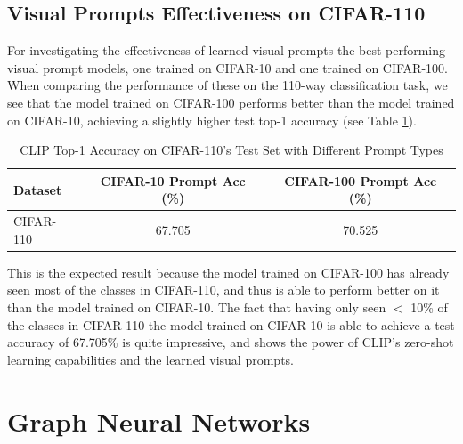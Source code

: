 \documentclass[a4paper]{article}
\begin{document}
\subsection{Visual Prompts Effectiveness on CIFAR-110}
For investigating the effectiveness of learned visual prompts the best performing visual prompt models, one trained
on CIFAR-10 and one trained on CIFAR-100. When comparing the performance of these on the 110-way classification
task, we see that the model trained on CIFAR-100 performs better than the model trained on CIFAR-10, achieving a
slightly higher test top-1 accuracy (see Table \ref{tab:cifar110}).

\begin{table}[h]
    \centering
    \begin{tabular}{|l|c|c|}
    \hline
    \rowcolor{Gray}
    \textbf{Dataset} & \textbf{CIFAR-10 Prompt Acc (\%)} & \textbf{CIFAR-100 Prompt Acc (\%)} \\ \hline
    CIFAR-110 & 67.705 & 70.525 \\ \hline
    \end{tabular}
    \caption{CLIP Top-1 Accuracy on CIFAR-110's Test Set with Different Prompt Types}
    \label{tab:cifar110}
\end{table}

This is the expected result because the model trained on CIFAR-100 has already seen most of the classes in CIFAR-110,
and thus is able to perform better on it than the model trained on CIFAR-10. The fact that having only seen $<$
10\% of the classes in CIFAR-110 the model trained on CIFAR-10 is able to achieve a test accuracy of 67.705\% is
quite impressive, and shows the power of CLIP's zero-shot learning capabilities and the learned visual prompts.

\section{Graph Neural Networks}
\end{document}
